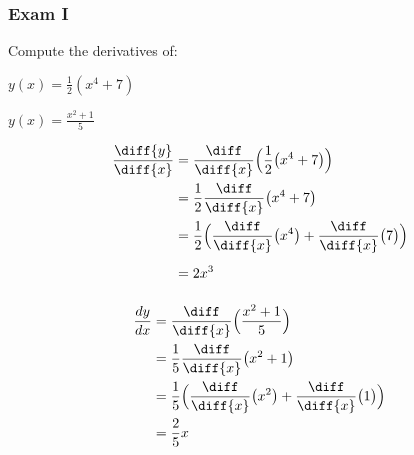 \documentclass[crop=false,class=book,oneside]{standalone}
\begin{document}
        \subsubsection{Exam I}
            \begin{problem}
                Compute the derivatives of:
                \begin{enumerate}[label=(\alph*)]
                    \begin{multicols}{2}
                        \item $y(x)=\frac{1}{2}(x^{4}+7)$
                        \item $y(x)=\frac{x^{2}+1}{5}$
                    \end{multicols}
                \end{enumerate}
            \end{problem}
            \begin{solution}
                \par\hfill\par
                \begin{minipage}[b]{.49\textwidth}
                    \centering
                    \begin{align*}
                        \frac{\diff{y}}{\diff{x}}
                        &=\frac{\diff}{\diff{x}}\Big(
                            \frac{1}{2}\big(x^{4}+7\big)
                        \Big)\\
                        &=\frac{1}{2}\frac{\diff}{\diff{x}}
                            \big(x^{4}+7\big)\\
                        &=\frac{1}{2}\Big(
                            \frac{\diff}{\diff{x}}
                            \big(x^{4}\big)+
                            \frac{\diff}{\diff{x}}
                            \big(7\big)\Big)
                        \vphantom{\frac{\diff}{\diff}}\\
                        &=2x^{3}\vphantom{\frac{\diff}{\diff}}
                    \end{align*}
                \end{minipage}
                \hfill
                \vline
                \begin{minipage}[b]{.49\textwidth}
                    \centering
                    \begin{align*}
                        \frac{dy}{dx}
                        &=\frac{\diff}{\diff{x}}
                            \Big(\frac{x^{2}+1}{5}\Big)\\
                        &=\frac{1}{5}\frac{\diff}{\diff{x}}
                            \big(x^{2}+1\big)\\
                        &=\frac{1}{5}\Big(
                            \frac{\diff}{\diff{x}}
                            \big(x^{2}\big)+
                            \frac{\diff}{\diff{x}}
                            \big(1\big)\Big)\\
                        &=\frac{2}{5}x
                    \end{align*}
                \end{minipage}
            \end{solution}
\end{document}
